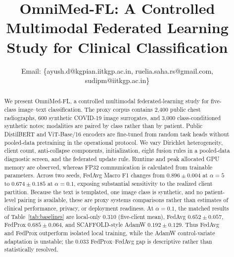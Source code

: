 \documentclass[letterpaper, conference]{IEEEtran}
\begin{document}
\renewcommand{\arraystretch}{0.85}
\setlength{\abovecaptionskip}{0pt}
\setlength{\belowcaptionskip}{0pt}

\setlength{\columnsep}{0.25in}

\renewcommand{\dbltopfraction}{0.9}
\renewcommand{\topfraction}{0.9}

\title{OmniMed-FL: A Controlled Multimodal Federated Learning Study for Clinical Classification}

\author{





Email: \{ayush.d@kgpian.iitkgp.ac.in, ruelia.saha.rs@gmail.com, sudipm@iitkgp.ac.in\}
}

\maketitle

\begin{abstract}
We present OmniMed-FL, a controlled multimodal federated-learning study for
five-class image--text classification. The proxy corpus contains 2,400 public
chest radiographs, 600 synthetic COVID-19 image surrogates, and 3,000
class-conditioned synthetic notes; modalities are paired by class rather than by
patient. Public DistilBERT and ViT-Base/16 encoders are fine-tuned from random task
heads without pooled-data pretraining in the operational protocol. We vary
Dirichlet heterogeneity, client count, anti-collapse components, initialization,
eight fusion rules in a pooled-data diagnostic screen, and the federated update
rule. Runtime and peak allocated GPU
memory are observed, whereas FP32 communication is calculated from trainable
parameters. Across two seeds, FedAvg Macro F1 changes from
$0.896\!\pm\!0.004$ at $\alpha{=}5$ to $0.674\!\pm\!0.185$ at
$\alpha{=}0.1$, exposing substantial sensitivity to the realized client
partition. Because the text is templated, one image class is synthetic, and no
patient-level pairing is available, these are proxy systems comparisons rather
than estimates of clinical performance, privacy, or deployment readiness. At
$\alpha{=}0.1$, the matched results of Table~\ref{tab:baselines} are
local-only 0.310 (five-client
mean), FedAvg $0.652\!\pm\!0.057$, FedProx
$0.685\!\pm\!0.064$, and SCAFFOLD-style AdamW
$0.192\!\pm\!0.129$. Thus FedAvg and FedProx outperform isolated local training,
while the AdamW control-variate adaptation is unstable; the 0.033 FedProx--FedAvg
gap is descriptive rather than statistically resolved.
\end{abstract}
\end{document}
